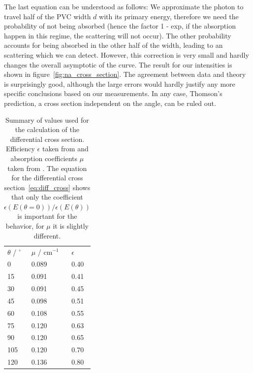 The last equation can be understood as follows: We approximate the photon to travel half of the PVC width $d$ with its
primary energy, therefore we need the probability of not being absorbed (hence the factor 1 - exp, if the absorption happen 
in this regime, the scattering will not occur). The other probability accounts for being absorbed in the other half of the width,
leading to an scattering which we can detect. However, this correction is very small and hardly changes the overall asymptotic
of the curve. The result for our intensities is shown in figure~\ref{fig:na_cross_section}. 
The agreement between data and theory is surprisingly good, although the large errors would hardly justify any 
more specific conclusions based on our measurements. In any case, Thomson's prediction, 
a cross section independent on the angle, can be ruled out.

\begin{table}

\caption{Summary of values used for the calculation of the differential cross
  section. Efficiency $\epsilon$ taken from \cite{fluegge} and absorption coefficients $\mu$
  taken from \cite{ver}. The equation for the differential cross section~\eqref{eq:diff_cross} shows that only the 
  coefficient $\epsilon(E(\theta = 0) ) / \epsilon(E(\theta))$ is important for the behavior, for $\mu$ it is slightly
different. }
  \begin{tabular}{lll}
      \rowcolor{LightCyan}  $\theta$ / $^\circ$ & $\mu$ / $\mathrm{cm}^{-1}$ & $\epsilon$ \\ 
      \cellcolor{LightCyan}  0 &    0.089 & 0.40 \\ 
 \cellcolor{LightCyan}  15 &   0.091 & 0.41  \\
 \cellcolor{LightCyan}  30 &   0.091 & 0.45  \\
 \cellcolor{LightCyan}  45 &   0.098 & 0.51  \\
 \cellcolor{LightCyan}  60 &   0.108 & 0.55  \\
 \cellcolor{LightCyan}  75 &   0.120 & 0.63  \\
 \cellcolor{LightCyan}  90 &   0.120 & 0.65  \\
 \cellcolor{LightCyan}  105 &  0.120 & 0.70  \\
 \cellcolor{LightCyan}  120 &  0.136 & 0.80  
  \end{tabular}
    \label{tab:cross}
\end{table}


